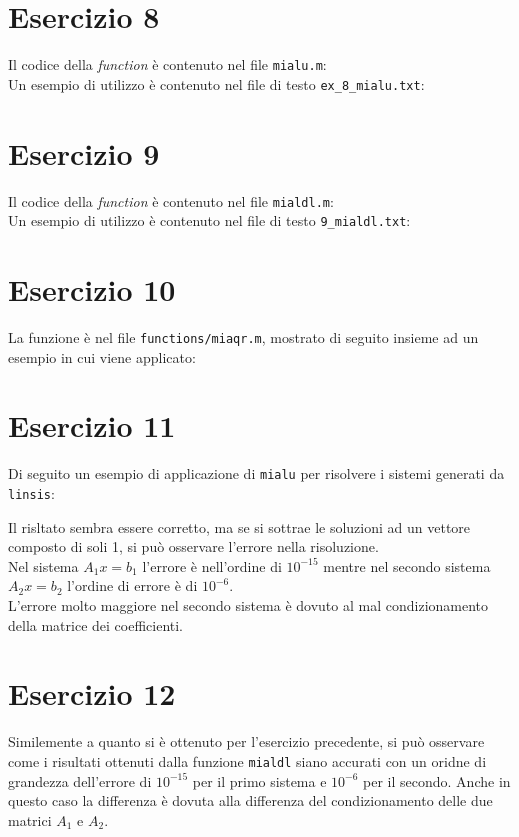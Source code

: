 \documentclass[10pt,a4paper]{article}
\begin{document}
\section*{Esercizio 8}
Il codice della \textit{function} è contenuto nel file \texttt{mialu.m}:\\
Un esempio di utilizzo è contenuto nel file di testo \texttt{ex\_8\_mialu.txt}:

\section*{Esercizio 9}
Il codice della \textit{function} è contenuto nel file \texttt{mialdl.m}:\\

Un esempio di utilizzo è contenuto nel file di testo \texttt{9\_mialdl.txt}:
\section*{Esercizio 10}
La funzione è nel file \texttt{functions/miaqr.m}, mostrato di seguito insieme ad un esempio in cui viene applicato:
\\


\pagebreak
\section*{Esercizio 11}
Di seguito un esempio di applicazione di \texttt{mialu} per risolvere i sistemi generati da \texttt{linsis}:

Il risltato sembra essere corretto, ma se si sottrae le soluzioni ad un vettore composto di soli 1, si può osservare l'errore nella risoluzione.\\
Nel sistema $A_1x=b_1$ l'errore è nell'ordine di $10^{-15}$ mentre nel secondo sistema $A_2x=b_2$ l'ordine di errore è di $10^{-6}$.\\
L'errore molto maggiore nel secondo sistema è dovuto al mal condizionamento della matrice dei coefficienti.

\section*{Esercizio 12}
Similemente a quanto si è ottenuto per l'esercizio precedente, si può osservare come i risultati ottenuti dalla funzione \texttt{mialdl} siano accurati con un oridne di grandezza dell'errore di $10^{-15}$ per il primo sistema e $10^{-6}$ per il secondo. Anche in questo caso la differenza è dovuta alla differenza del condizionamento delle due matrici $A_1$ e $A_2$.

\end{document}
